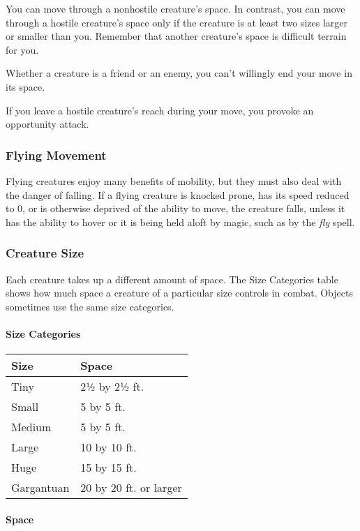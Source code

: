 \documentclass[
]{article}
\begin{document}
You can move through a nonhostile creature's space. In contrast, you can
move through a hostile creature's space only if the creature is at least
two sizes larger or smaller than you. Remember that another creature's
space is difficult terrain for you.

Whether a creature is a friend or an enemy, you can't willingly end your
move in its space.

If you leave a hostile creature's reach during your move, you provoke an
opportunity attack.

\hypertarget{flying-movement}{%
\subsubsection{Flying Movement}\label{flying-movement}}

Flying creatures enjoy many benefits of mobility, but they must also
deal with the danger of falling. If a flying creature is knocked prone,
has its speed reduced to 0, or is otherwise deprived of the ability to
move, the creature falls, unless it has the ability to hover or it is
being held aloft by magic, such as by the \emph{fly} spell.

\hypertarget{creature-size}{%
\subsubsection{Creature Size}\label{creature-size}}

Each creature takes up a different amount of space. The Size Categories
table shows how much space a creature of a particular size controls in
combat. Objects sometimes use the same size categories.

\hypertarget{size-categories}{%
\paragraph{Size Categories}\label{size-categories}}

\begin{longtable}[]{@{}ll@{}}
\toprule
Size & Space\tabularnewline
\midrule
\endhead
Tiny & 2½ by 2½ ft.\tabularnewline
Small & 5 by 5 ft.\tabularnewline
Medium & 5 by 5 ft.\tabularnewline
Large & 10 by 10 ft.\tabularnewline
Huge & 15 by 15 ft.\tabularnewline
Gargantuan & 20 by 20 ft. or larger\tabularnewline
\bottomrule
\end{longtable}

\hypertarget{space}{%
\paragraph{Space}\label{space}}
\end{document}

